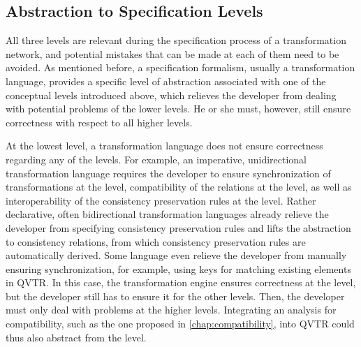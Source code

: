 \subsection{Abstraction to Specification Levels}

All three levels are relevant during the specification process of a transformation network, and potential mistakes that can be made at each of them need to be avoided.
As mentioned before, a specification formalism, usually a transformation language, provides a specific level of abstraction associated with one of the conceptual levels introduced above, which relieves the developer from dealing with potential problems of the lower levels.
He or she must, however, still ensure correctness with respect to all higher levels.

At the lowest level, a transformation language does not ensure correctness regarding any of the levels.
For example, an imperative, unidirectional transformation language requires the developer to ensure synchronization of transformations at the \leveltransformation level, compatibility of the relations at the \levelnetworkrelation level, as well as interoperability of the consistency preservation rules at the \levelnetworkrule level.
Rather declarative, often bidirectional transformation languages already relieve the developer from specifying consistency preservation rules and lifts the abstraction to consistency relations, from which consistency preservation rules are automatically derived.
Some language even relieve the developer from manually ensuring synchronization, for example, using keys for matching existing elements in \gls{QVTR}.
In this case, the transformation engine ensures correctness at the \leveltransformation level, but the developer still has to ensure it for the other levels.
Then, the developer must only deal with problems at the higher levels.
Integrating an analysis for compatibility, such as the one proposed in \autoref{chap:compatibility}, into \gls{QVTR} could thus also abstract from the \levelnetworkrelation level.

